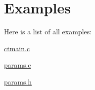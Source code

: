 \section{Examples}
Here is a list of all examples\+:\begin{DoxyCompactItemize}
\item 
\hyperlink{ctmain_8c-example}{ctmain.\+c}
\item 
\hyperlink{params_8c-example}{params.\+c}
\item 
\hyperlink{params_8h-example}{params.\+h}
\end{DoxyCompactItemize}
